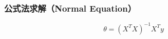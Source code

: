 \subsubsection{公式法求解（Normal Equation）}
\begin{equation}
	\theta = (X^T X)^{-1} X^T y
\end{equation}

































